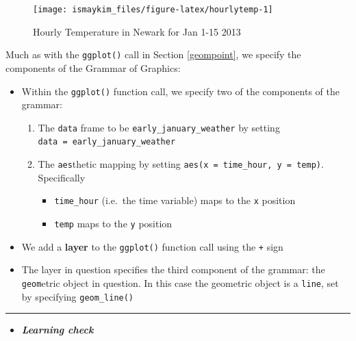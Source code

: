 \documentclass[]{tufte-book}
\let\oldrule=\rule
\renewcommand{\rule}[1]{\oldrule{\linewidth}}
\providecommand{\tightlist}{%
  \setlength{\itemsep}{0pt}\setlength{\parskip}{0pt}}
\newenvironment{rmdblock}[1]
  {\begin{shaded*}
  \begin{itemize}
  \renewcommand{\labelitemi}{
    \raisebox{-.7\height}[0pt][0pt]{
    }
  }
  \item
  }
  {
  \end{itemize}
  \end{shaded*}
  }
\newenvironment{learncheck}
  {\begin{rmdblock}{warning}}
  {\end{rmdblock}}
\begin{document}
\begin{figure}

{\centering \texttt{[image: ismaykim\_files/figure-latex/hourlytemp-1]} 

}

\caption[Hourly Temperature in Newark for Jan 1-15 2013]{Hourly Temperature in Newark for Jan 1-15 2013}\label{fig:hourlytemp}
\end{figure}

Much as with the \texttt{ggplot()} call in Section \ref{geompoint}, we
specify the components of the Grammar of Graphics:

\begin{itemize}
\tightlist
\item
  Within the \texttt{ggplot()} function call, we specify two of the
  components of the grammar:

  \begin{enumerate}
  \def\labelenumi{\arabic{enumi}.}
  \tightlist
  \item
    The \texttt{data} frame to be \texttt{early\_january\_weather} by
    setting \texttt{data\ =\ early\_january\_weather}
  \item
    The \texttt{aes}thetic mapping by setting
    \texttt{aes(x\ =\ time\_hour,\ y\ =\ temp)}. Specifically

    \begin{itemize}
    \tightlist
    \item
      \texttt{time\_hour} (i.e.~the time variable) maps to the
      \texttt{x} position
    \item
      \texttt{temp} maps to the \texttt{y} position
    \end{itemize}
  \end{enumerate}
\item
  We add a \textbf{layer} to the \texttt{ggplot()} function call using
  the \texttt{+} sign
\item
  The layer in question specifies the third component of the grammar:
  the \texttt{geom}etric object in question. In this case the geometric
  object is a \texttt{line}, set by specifying \texttt{geom\_line()}
\end{itemize}

\begin{center}\rule{0.5\linewidth}{\linethickness}\end{center}

\begin{learncheck}
\textbf{\emph{Learning check}}
\end{learncheck}
\end{document}
